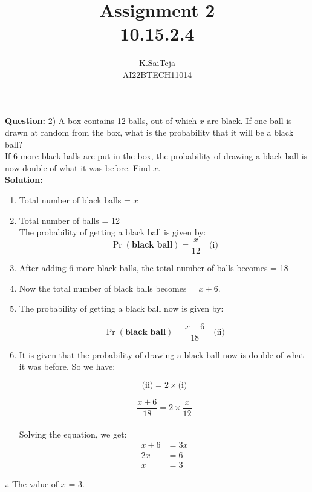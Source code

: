 \documentclass[journal,12pt,two column]{IEEEtran}
\title{Assignment 2 \\ 10.15.2.4}
\author{K.SaiTeja \\ AI22BTECH11014}
\providecommand{\pr}[1]{\ensuremath{\Pr\left(#1\right)}}
\newcommand{\question}{\noindent \textbf{Question: }}
\newcommand{\solution}{\noindent \textbf{Solution: }}
\begin{document}
\maketitle
\question 2)
A box contains 12 balls, out of which $x$ are black. If one ball is drawn at random from the box, what is the probability that it will be a black ball?\\ If 6 more black balls are put in the box, the probability of drawing a black ball is now double of what it was before. Find $x$.\\
\solution \\
\begin{enumerate}
    \item Total number of black balls = $x$
    \item Total number of balls = 12 \\
   The probability of getting a black ball is given by:
  $$\pr{\textbf{black ball}} = \frac{x}{12} \quad \text{(i)}$$
  
  \item After adding 6 more black balls, the total number of balls becomes = 18 \\
  
  \item Now the total number of black balls becomes = $x+6$.
  
  \item The probability of getting a black ball now is given by:
  
  $$\pr{\textbf{black ball}} = \frac{x+6}{18} \quad \text{(ii)}$$
  
  \item It is given that the probability of drawing a black ball now is double of what it was before. So we have:
  
  $$\text{(ii)} = 2 \times \text{(i)}$$

  $$\frac{x+6}{18} = 2 \times \frac{x}{12}$$  \\
  \text Solving the equation, we get:
\begin{align}   
 x + 6 &= 3x \\
  2x &= 6 \\
  x &= 3
\end{align}
 
\end{enumerate}
\begin{center}
$\therefore$ The value of $x$ = 3.
\end{center}
\end{document}
